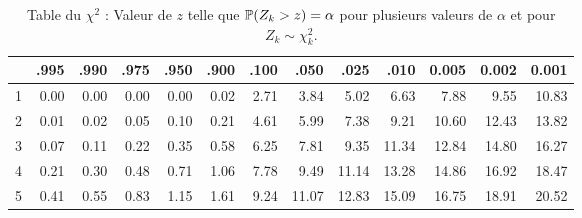 \documentclass[french,11pt]{article}
\begin{document}
\begin{table}[h]
  \centering
  \begin{tabular}{|r|r|r|r|r|r|r|r|r|r|r|r|r|} \hline
      & .995 & .990 & .975 & .950 & .900 & .100 & .050  & .025  & .010 & 0.005 & 0.002 & 0.001 \\ \hline
    1 & 0.00 & 0.00 & 0.00 & 0.00 & 0.02 & 2.71 & 3.84  & 5.02  & 6.63 & 7.88 & 9.55 & 10.83 \\ \hline
    2 & 0.01 & 0.02 & 0.05 & 0.10 & 0.21 & 4.61 & 5.99  & 7.38  & 9.21 & 10.60 & 12.43 & 13.82 \\ \hline
    3 & 0.07 & 0.11 & 0.22 & 0.35 & 0.58 & 6.25 & 7.81  & 9.35  &  11.34 & 12.84 & 14.80 & 16.27 \\ \hline
    4 & 0.21 & 0.30 & 0.48 & 0.71 & 1.06 & 7.78 & 9.49  & 11.14 &  13.28 & 14.86 & 16.92 & 18.47 \\ \hline
    5 & 0.41 & 0.55 & 0.83 & 1.15 & 1.61 & 9.24 & 11.07 & 12.83 &  15.09 & 16.75 & 18.91 & 20.52 \\ \hline
  \end{tabular}
  \caption{Table du $\chi^2$ : Valeur de $z$ telle que $\mathbb{P}(Z_k > z) = \alpha$ pour 
    plusieurs valeurs de $\alpha$ et pour $Z_k \sim \chi^2_k$.}
  \label{tab:chi2}
\end{table}
\end{document}
